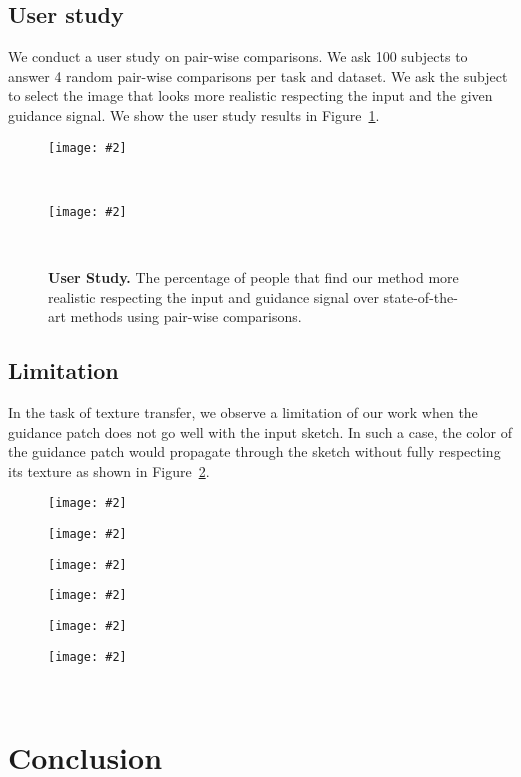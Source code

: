 \documentclass[10pt,twocolumn,letterpaper]{article}
\newlength\secmargin
\newlength\figcapmargin
\newcommand{\figref}[1]{Figure~\ref{fig:#1}}
\newcommand{\mfigure}[2]
{
\begin{minipage}{#1\linewidth}\centering
\texttt{[image: \#2]}
\end{minipage}
}
\begin{document}
\subsection{User study}
We conduct a user study on pair-wise comparisons. We ask 100 subjects to answer 4 random pair-wise comparisons per task and dataset. We ask the subject to select the image that looks more realistic respecting the input and the given guidance signal. We show the user study results in \figref{user_study}.
\begin{figure}[t]
\centering
\mfigure{1}{fig/user_100_results.png} \\
\mfigure{0.9}{fig/horizontal_legend.png} \\

\caption{\textbf{User Study.} The percentage of people that find our method more realistic respecting the input and guidance signal over state-of-the-art methods using pair-wise comparisons.}

\label{fig:user_study}
\end{figure}
 
\vspace{\secmargin}
\subsection{Limitation}
In the task of texture transfer, we observe a limitation of our work when the guidance patch does not go well with the input sketch. In such a case, the color of the guidance patch would propagate through the sketch without fully respecting its texture as shown in \figref{bag_failure}.
\begin{figure}[t]
\centering

\mfigure{0.15}{{limitations/bag_input_1.png}}\hfill
\mfigure{0.15}{{limitations/bag_ours_1.png}}\hfill
\mfigure{0.15}{{limitations/bag_input_2.png}}\hfill
\mfigure{0.15}{{limitations/bag_ours_2.png}}\hfill
\mfigure{0.15}{{limitations/shoes_input_1.png}}\hfill
\mfigure{0.15}{{limitations/shoes_ours_1.png}}\\

\vspace{\figcapmargin}
\label{fig:bag_failure}
\end{figure} 
 \section{Conclusion}
\label{sec:conclusions}
\end{document}
